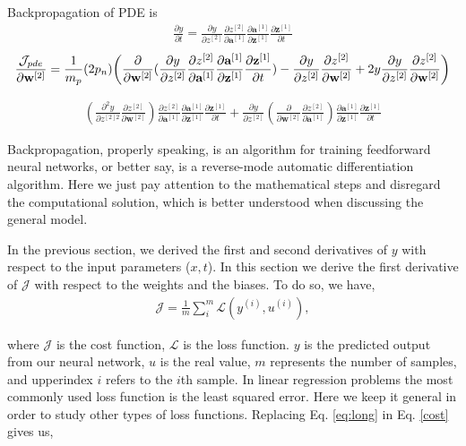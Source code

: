 \documentclass{article}
\begin{document}
Backpropagation of PDE is
\begin{align}
\frac{\partial y}{\partial t}=\frac{\partial y}{\partial z^{[2]}}\frac{\partial z^{[2]}}{\partial \textbf{a}^{[1]}}\frac{\partial \textbf{a}^{[1]}}{\partial \textbf{z}^{[1]}}\frac{\partial \textbf{z}^{[1]}}{\partial t}
\label{cost} 
\end{align}
\begin{align}
\frac{\mathcal{J}_{pde}}{\partial \textbf{w}^{[2]}}=\frac{1}{m_p}(2p_n)\bigg{(}\frac{\partial}{\partial \textbf{w}^{[2]}}(\frac{\partial y}{\partial z^{[2]}}\frac{\partial z^{[2]}}{\partial \textbf{a}^{[1]}}\frac{\partial \textbf{a}^{[1]}}{\partial \textbf{z}^{[1]}}\frac{\partial \textbf{z}^{[1]}}{\partial t})-\frac{\partial y}{\partial z^{[2]}}\frac{\partial z^{[2]}}{\partial \textbf{w}^{[2]}}+ 2y\frac{\partial y}{\partial z^{[2]}}\frac{\partial z^{[2]}}{\partial \textbf{w}^{[2]}}\bigg{)}
\label{cost} 
\end{align}

\begin{align}
(\frac{\partial^2 y}{\partial z^{[2]2}}\frac{\partial z^{[2]}}{\partial \textbf{w}^{[2]}})\frac{\partial z^{[2]}}{\partial \textbf{a}^{[1]}}\frac{\partial \textbf{a}^{[1]}}{\partial \textbf{z}^{[1]}}\frac{\partial \textbf{z}^{[1]}}{\partial t}+\frac{\partial y}{\partial z^{[2]}}(\frac{\partial}{\partial \textbf{w}^{[2]}}\frac{\partial z^{[2]}}{\partial \textbf{a}^{[1]}})\frac{\partial \textbf{a}^{[1]}}{\partial \textbf{z}^{[1]}}\frac{\partial \textbf{z}^{[1]}}{\partial t}
\label{cost} 
\end{align}


Backpropagation, properly speaking, is an algorithm for training feedforward neural networks, or better say, is a reverse-mode automatic differentiation algorithm. Here we just pay attention to the mathematical steps and disregard the computational solution, which is better understood when discussing the general model. 
 
In the previous section, we derived the first and second derivatives of $y$ with respect to the input parameters ($x,t$). In this section we derive the first derivative of $\mathcal{J}$ with respect to the weights and the biases. To do so, we have,
\begin{align}
\mathcal{J}=\frac{1}{m}\sum_i^m \mathcal{L}(y^{(i)},u^{(i)}),
\label{cost} 
\end{align}
 
where $\mathcal{J}$ is the cost function, $\mathcal{L}$ is the loss function. $y$ is the predicted output from our neural network, $u$ is the real value, $m$ represents the number of samples, and upperindex $i$ refers to the $i$th sample. In linear regression problems the most commonly used loss function is the least squared error. Here we keep it general in order to study other types of loss functions. Replacing Eq. \eqref{eq:long} in Eq. \eqref{cost} gives us,
\end{document}

